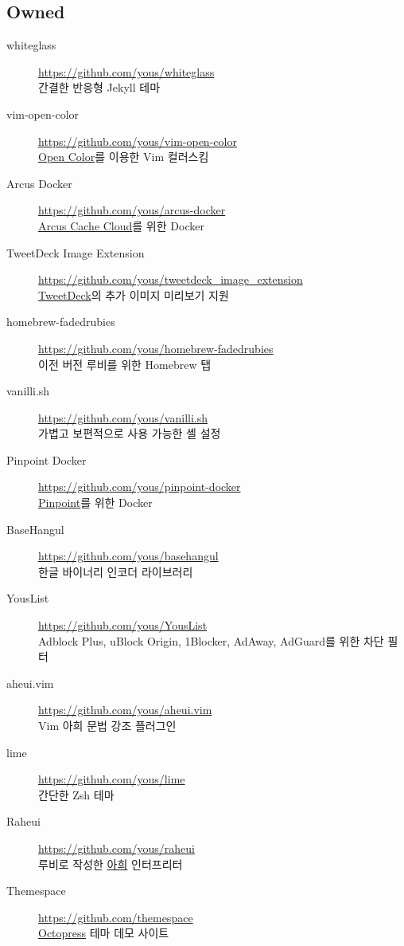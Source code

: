 \documentclass[a4paper,10pt]{article}
\begin{document}
\subsection{Owned}
\begin{description}
  \item[whiteglass] \url{https://github.com/yous/whiteglass} \\
    간결한 반응형 Jekyll 테마
  \item[vim-open-color] \url{https://github.com/yous/vim-open-color} \\
    \href{https://yeun.github.io/open-color/}{Open Color}를 이용한 Vim 컬러스킴
  \item[Arcus Docker] \url{https://github.com/yous/arcus-docker} \\
    \href{https://github.com/naver/arcus}{Arcus Cache Cloud}를 위한 Docker
  \item[TweetDeck Image Extension] \url{https://github.com/yous/tweetdeck_image_extension} \\
    \href{https://tweetdeck.twitter.com}{TweetDeck}의 추가 이미지 미리보기 지원
  \item[homebrew-fadedrubies] \url{https://github.com/yous/homebrew-fadedrubies} \\
    이전 버전 루비를 위한 Homebrew 탭
  \item[vanilli.sh] \url{https://github.com/yous/vanilli.sh} \\
    가볍고 보편적으로 사용 가능한 셸 설정
  \item[Pinpoint Docker] \url{https://github.com/yous/pinpoint-docker} \\
    \href{https://github.com/naver/pinpoint}{Pinpoint}를 위한 Docker
  \item[BaseHangul] \url{https://github.com/yous/basehangul} \\
    한글 바이너리 인코더 라이브러리
  \item[YousList] \url{https://github.com/yous/YousList} \\
    Adblock Plus, uBlock Origin, 1Blocker, AdAway, AdGuard를 위한 차단 필터
  \item[aheui.vim] \url{https://github.com/yous/aheui.vim} \\
    Vim 아희 문법 강조 플러그인
  \item[lime] \url{https://github.com/yous/lime} \\
    간단한 Zsh 테마
  \item[Raheui] \url{https://github.com/yous/raheui} \\
    루비로 작성한 \href{http://aheui.github.io}{아희} 인터프리터
  \item[Themespace] \url{https://github.com/themespace} \\
    \href{http://octopress.org}{Octopress} 테마 데모 사이트
\end{description}
\end{document}

